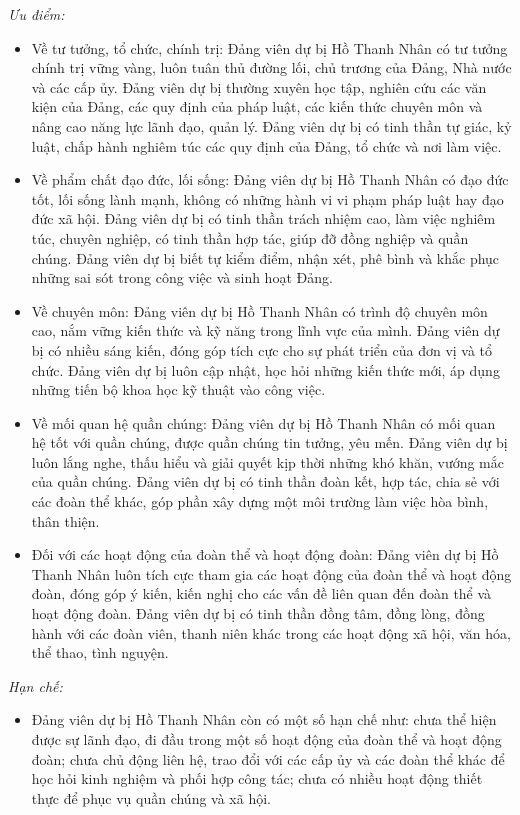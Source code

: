 \documentclass[]{article}
\begin{document}
\emph{Ưu điểm: }

\begin{itemize}
\item
  Về tư tưởng, tổ chức, chính trị: Đảng viên dự bị Hồ Thanh Nhân có tư
  tưởng chính trị vững vàng, luôn tuân thủ đường lối, chủ trương của
  Đảng, Nhà nước và các cấp ủy. Đảng viên dự bị thường xuyên học tập,
  nghiên cứu các văn kiện của Đảng, các quy định của pháp luật, các kiến
  thức chuyên môn và nâng cao năng lực lãnh đạo, quản lý. Đảng viên dự
  bị có tinh thần tự giác, kỷ luật, chấp hành nghiêm túc các quy định
  của Đảng, tổ chức và nơi làm việc.
\item
  Về phẩm chất đạo đức, lối sống: Đảng viên dự bị Hồ Thanh Nhân có đạo
  đức tốt, lối sống lành mạnh, không có những hành vi vi phạm pháp luật
  hay đạo đức xã hội. Đảng viên dự bị có tinh thần trách nhiệm cao, làm
  việc nghiêm túc, chuyên nghiệp, có tinh thần hợp tác, giúp đỡ đồng
  nghiệp và quần chúng. Đảng viên dự bị biết tự kiểm điểm, nhận xét, phê
  bình và khắc phục những sai sót trong công việc và sinh hoạt Đảng.
\item
  Về chuyên môn: Đảng viên dự bị Hồ Thanh Nhân có trình độ chuyên môn
  cao, nắm vững kiến thức và kỹ năng trong lĩnh vực của mình. Đảng viên
  dự bị có nhiều sáng kiến, đóng góp tích cực cho sự phát triển của đơn
  vị và tổ chức. Đảng viên dự bị luôn cập nhật, học hỏi những kiến thức
  mới, áp dụng những tiến bộ khoa học kỹ thuật vào công việc.
\item
  Về mối quan hệ quần chúng: Đảng viên dự bị Hồ Thanh Nhân có mối quan
  hệ tốt với quần chúng, được quần chúng tin tưởng, yêu mến. Đảng viên
  dự bị luôn lắng nghe, thấu hiểu và giải quyết kịp thời những khó khăn,
  vướng mắc của quần chúng. Đảng viên dự bị có tinh thần đoàn kết, hợp
  tác, chia sẻ với các đoàn thể khác, góp phần xây dựng một môi trường
  làm việc hòa bình, thân thiện.
\item
  Đối với các hoạt động của đoàn thể và hoạt động đoàn: Đảng viên dự bị
  Hồ Thanh Nhân luôn tích cực tham gia các hoạt động của đoàn thể và
  hoạt động đoàn, đóng góp ý kiến, kiến nghị cho các vấn đề liên quan
  đến đoàn thể và hoạt động đoàn. Đảng viên dự bị có tinh thần đồng tâm,
  đồng lòng, đồng hành với các đoàn viên, thanh niên khác trong các hoạt
  động xã hội, văn hóa, thể thao, tình nguyện.
\end{itemize}

\emph{Hạn chế: }

\begin{itemize}
\item
  Đảng viên dự bị Hồ Thanh Nhân còn có một số hạn chế như: chưa thể hiện
  được sự lãnh đạo, đi đầu trong một số hoạt động của đoàn thể và hoạt
  động đoàn; chưa chủ động liên hệ, trao đổi với các cấp ủy và các đoàn
  thể khác để học hỏi kinh nghiệm và phối hợp công tác; chưa có nhiều
  hoạt động thiết thực để phục vụ quần chúng và xã hội.
\end{itemize}
\end{document}
